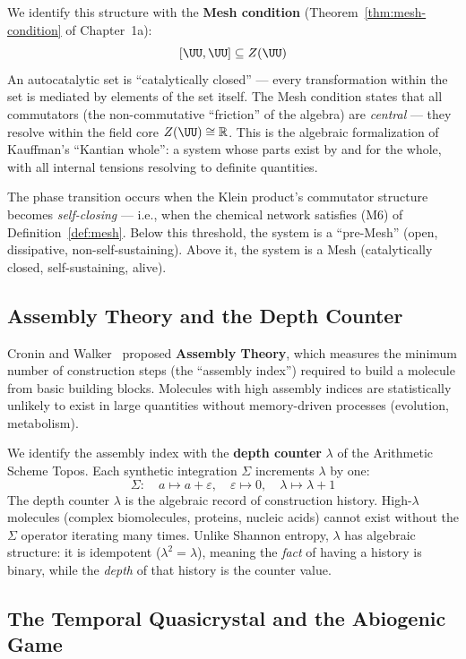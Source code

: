 We identify this structure with the \textbf{Mesh condition} (Theorem~\ref{thm:mesh-condition} of Chapter~1a):
$$[\UU, \UU] \subseteq Z(\UU)$$
An autocatalytic set is ``catalytically closed'' --- every transformation within the set is mediated by elements of the set itself. The Mesh condition states that all commutators (the non-commutative ``friction'' of the algebra) are \emph{central} --- they resolve within the field core $Z(\UU) \cong \mathbb{R}$. This is the algebraic formalization of Kauffman's ``Kantian whole'': a system whose parts exist by and for the whole, with all internal tensions resolving to definite quantities.

The phase transition occurs when the Klein product's commutator structure becomes \emph{self-closing} --- i.e., when the chemical network satisfies (M6) of Definition~\ref{def:mesh}. Below this threshold, the system is a ``pre-Mesh'' (open, dissipative, non-self-sustaining). Above it, the system is a Mesh (catalytically closed, self-sustaining, alive).

\subsection{Assembly Theory and the Depth Counter}

Cronin and Walker~\cite{cronin2023} proposed \textbf{Assembly Theory}, which measures the minimum number of construction steps (the ``assembly index'') required to build a molecule from basic building blocks. Molecules with high assembly indices are statistically unlikely to exist in large quantities without memory-driven processes (evolution, metabolism).

We identify the assembly index with the \textbf{depth counter} $\lambda$ of the Arithmetic Scheme Topos. Each synthetic integration $\Sigma$ increments $\lambda$ by one:
$$\Sigma: \quad a \mapsto a + \varepsilon, \quad \varepsilon \mapsto 0, \quad \lambda \mapsto \lambda + 1$$
The depth counter $\lambda$ is the algebraic record of construction history. High-$\lambda$ molecules (complex biomolecules, proteins, nucleic acids) cannot exist without the $\Sigma$ operator iterating many times. Unlike Shannon entropy, $\lambda$ has algebraic structure: it is idempotent ($\lambda^2 = \lambda$), meaning the \emph{fact} of having a history is binary, while the \emph{depth} of that history is the counter value.

\subsection{The Temporal Quasicrystal and the Abiogenic Game}

